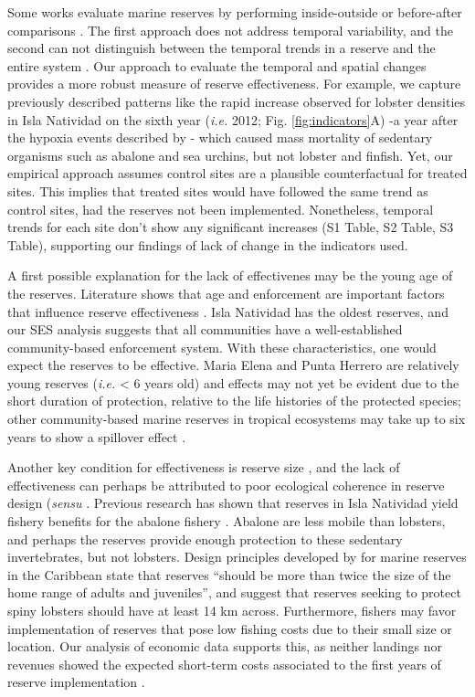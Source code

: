 \documentclass{frontiersSCNS}
\theoremstyle{definition}
\theoremstyle{definition}
\theoremstyle{definition}
\theoremstyle{remark}
\begin{document}
Some works evaluate marine reserves by performing inside-outside
\citep{guidetti_2014-8Z,friedlander_2017-oI,rodriguez_2017-PD} or
before-after comparisons \citep{betti_2017-lq}. The first approach does
not address temporal variability, and the second can not distinguish
between the temporal trends in a reserve and the entire system
\citep{depalma_2018}. Our approach to evaluate the temporal and spatial
changes provides a more robust measure of reserve effectiveness. For
example, we capture previously described patterns like the rapid
increase observed for lobster densities in Isla Natividad on the sixth
year (\emph{i.e.} 2012; Fig. \ref{fig:indicators}A) -a year after the
hypoxia events described by \citet{micheli_2012-EU}- which caused mass
mortality of sedentary organisms such as abalone and sea urchins, but
not lobster and finfish. Yet, our empirical approach assumes control
sites are a plausible counterfactual for treated sites. This implies
that treated sites would have followed the same trend as control sites,
had the reserves not been implemented. Nonetheless, temporal trends for
each site don't show any significant increases (S1 Table, S2 Table, S3
Table), supporting our findings of lack of change in the indicators
used.

A first possible explanation for the lack of effectivenes may be the
young age of the reserves. Literature shows that age and enforcement are
important factors that influence reserve effectiveness
\citep{edgar_2014-UO,babcock_2010}. Isla Natividad has the oldest
reserves, and our SES analysis suggests that all communities have a
well-established community-based enforcement system. With these
characteristics, one would expect the reserves to be effective. Maria
Elena and Punta Herrero are relatively young reserves (\emph{i.e.}
\textless{} 6 years old) and effects may not yet be evident due to the
short duration of protection, relative to the life histories of the
protected species; other community-based marine reserves in tropical
ecosystems may take up to six years to show a spillover effect
\citep{dasilva_2015-zX}.

Another key condition for effectiveness is reserve size
\citep{edgar_2014-UO}, and the lack of effectiveness can perhaps be
attributed to poor ecological coherence in reserve design (\emph{sensu}
\citet{rees_2018}. Previous research has shown that reserves in Isla
Natividad yield fishery benefits for the abalone fishery
\citep{rossetto_2015-V0}. Abalone are less mobile than lobsters, and
perhaps the reserves provide enough protection to these sedentary
invertebrates, but not lobsters. Design principles developed by
\citet{green_2017} for marine reserves in the Caribbean state that
reserves ``should be more than twice the size of the home range of
adults and juveniles'', and suggest that reserves seeking to protect
spiny lobsters should have at least 14 km across. Furthermore, fishers
may favor implementation of reserves that pose low fishing costs due to
their small size or location. Our analysis of economic data supports
this, as neither landings nor revenues showed the expected short-term
costs associated to the first years of reserve implementation
\citep{ovando_2016-Wg}.
\end{document}
